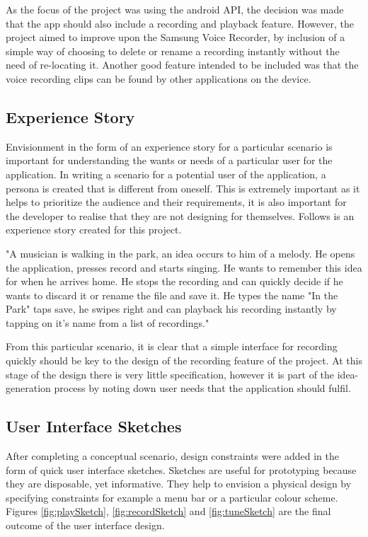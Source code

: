 \documentclass[conference]{acmsiggraph}
\begin{document}
As the focus of the project was using the android API, the decision was made that the app should also include a recording and playback feature. However, the project aimed to improve upon the Samsung Voice Recorder, by inclusion of a simple way of choosing to delete or rename a recording instantly without the need of re-locating it. Another good feature intended to be included was that the voice recording clips can be found by other applications on the device. 

\subsection{Experience Story}

Envisionment in the form of an experience story for a particular scenario is important for understanding the wants or needs of a particular user for the application. In writing a scenario for a potential user of the application, a persona is created that is different from oneself. This is extremely important as it helps to prioritize the audience and their requirements, it is also important for the developer to realise that they are not designing for themselves. Follows is an experience story created for this project.

"A musician is walking in the park, an idea occurs to him of a melody. He opens the application, presses record and starts singing. He wants to remember this idea for when he arrives home. He stops the recording and can quickly decide if he wants to discard it or rename the file and save it. He types the name "In the Park" taps save, he swipes right and can playback his recording instantly by tapping on it's name from a list of recordings." 

From this particular scenario, it is clear that a simple interface for recording quickly should be key to the design of the recording feature of the project. At this stage of the design there is very little specification, however it is part of the idea-generation process by noting down user needs that the application should fulfil.

\subsection{User Interface Sketches}

After completing a conceptual scenario, design constraints were added in the form of quick user interface sketches. Sketches are useful for prototyping because they are disposable, yet informative. They help to envision a physical design by specifying constraints for example a menu bar or a particular colour scheme. Figures \ref{fig:playSketch}, \ref{fig:recordSketch} and \ref{fig:tuneSketch} are the final outcome of the user interface design.
\end{document}
